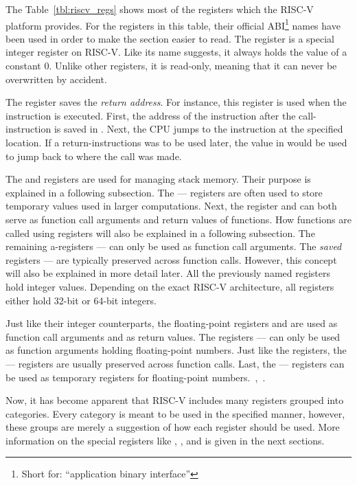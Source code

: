 The Table~\ref{tbl:riscv_regs} shows most of the registers which the RISC-V platform provides.
For the registers in this table, their official ABI\footnote{Short for: \enquote{application binary interface}} names have been used in order to make the section easier to read.
The  register is a special integer register on RISC-V.
Like its name suggests, it always holds the value of a constant 0.
Unlike other registers, it is read-only, meaning that it can never be overwritten by accident.

The  register saves the \emph{return address}.
For instance, this register is used when the  instruction is executed.
First, the address of the instruction after the call-instruction is saved in .
Next, the CPU jumps to the instruction at the specified location.
If a return-instructions was to be used later, the value in  would be used to jump back to where the call was made.

The  and  registers are used for managing stack memory.
Their purpose is explained in a following subsection.
The  —  registers are often used to store temporary values used in larger computations.
Next, the register  and  can both serve as function call arguments and return values of functions.
How functions are called using registers will also be explained in a following subsection.
The remaining a-registers  —  can only be used as function call arguments.
The \emph{saved} registers  —  are typically preserved across function calls.
However, this concept will also be explained in more detail later.
All the previously named registers hold integer values.
Depending on the exact RISC-V architecture, all registers either hold 32-bit or 64-bit integers.

Just like their integer counterparts, the floating-point registers  and  are used as function call arguments and as return values.
The registers  —  can only be used as function arguments holding floating-point numbers.
Just like the  registers, the  —  registers are usually preserved across function calls.
Last, the  —  registers can be used as temporary registers for floating-point numbers.~\cite[pp.~18f,p.~34]{Patterson2017},~\cite[p~.155]{Waterman2019}.

Now, it has become apparent that RISC-V includes many registers grouped into categories.
Every category is meant to be used in the specified manner, however, these groups are merely a suggestion of how each register should be used.
More information on the special registers like , , and  is given in the next sections.

